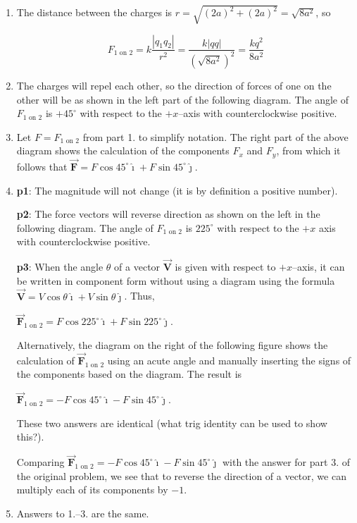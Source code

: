 \documentclass{article}
\renewcommand{\mbox}{\text}
\newcommand{\ihat}[0]{\hat{\boldsymbol{\imath}}}
\newcommand{\jhat}[0]{\hat{\boldsymbol{\jmath}}}
\newcommand{\bfvec}[1]{\vec{\mathbf{#1}}}
\begin{document}
\begin{enumerate}

  \item The distance between the charges is $r=\sqrt{(2a)^2+(2a)^2}=\sqrt{8a^2}$, so

        $$F_{1\mbox{ on } 2}=k\frac{|q_1q_2|}{r^2}=\frac{k|qq|}{(\sqrt{8a^2})^2}=\frac{kq^2}{8a^2}$$

  \item The charges will repel each other, so the direction of forces of one on the other will be as shown in the left part of the following diagram. The angle of $F_{1\mbox{ on } 2}$ is $+45^\circ$ with respect to the $+x$--axis with counterclockwise positive.

        

  \item Let $F = F_{1\mbox{ on } 2}$ from part 1. to simplify notation. The right part of the above diagram shows the calculation of the components $F_x$ and $F_y$, from which it follows that $\bfvec{F} = F\cos 45^\circ \ihat + F\sin 45^\circ \jhat$.

  \item 

        \textbf{p1}: The magnitude will not change (it is by definition a positive number).

        \textbf{p2}: The force vectors will reverse direction as shown on the left in the following diagram. The angle of $F_{1\mbox{ on } 2}$ is $225^\circ$ with respect to the $+x$ axis with counterclockwise positive.

        \textbf{p3}: When the angle $\theta$ of a vector $\bfvec{V}$ is given with respect to $+x$--axis, it can be written in component form without using a diagram using the formula $\bfvec{V} = V\cos\theta\ihat + V\sin\theta\jhat$. Thus,

        $\bfvec{F}_{1\mbox{ on } 2} = F\cos 225^\circ \ihat + F\sin 225^\circ \jhat$.

        Alternatively, the diagram on the right of the following figure shows the calculation of $\bfvec{F}_{1\mbox{ on } 2}$ using an acute angle and manually inserting the signs of the components based on the diagram. The result is

        $\bfvec{F}_{1\mbox{ on } 2} = -F\cos 45^\circ \ihat - F\sin 45^\circ \jhat$.

        These two answers are identical (what trig identity can be used to show this?).

        Comparing $\bfvec{F}_{1\mbox{ on } 2} = -F\cos 45^\circ \ihat - F\sin 45^\circ \jhat$ with the answer for part 3. of the original problem, we see that to reverse the direction of a vector, we can multiply each of its components by $-1$.

        

  \item Answers to 1.--3. are the same.

\end{enumerate}
\end{document}
